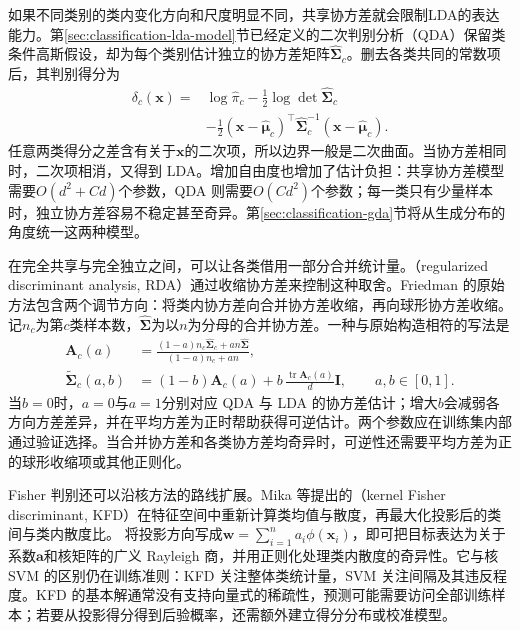如果不同类别的类内变化方向和尺度明显不同，共享协方差就会限制LDA的表达能力。第\ref{sec:classification-lda-model}节已经定义的二次判别分析（QDA）保留类条件高斯假设，却为每个类别估计独立的协方差矩阵$\hat{\bm{\Sigma}}_c$。删去各类共同的常数项后，其判别得分为
\begin{equation}
  \begin{aligned}
    \delta_c(\bm{x})
      ={}&\log\hat{\pi}_c-\frac12\log\det\hat{\bm{\Sigma}}_c\\
        &-\frac12(\bm{x}-\hat{\bm{\mu}}_c)^\top
          \hat{\bm{\Sigma}}_c^{-1}(\bm{x}-\hat{\bm{\mu}}_c).
  \end{aligned}
  \label{eq:classification-qda-score}
\end{equation}
任意两类得分之差含有关于$\bm{x}$的二次项，所以边界一般是二次曲面。当协方差相同时，二次项相消，又得到 LDA。增加自由度也增加了估计负担：共享协方差模型需要$O(d^2+Cd)$个参数，QDA 则需要$O(Cd^2)$个参数；每一类只有少量样本时，独立协方差容易不稳定甚至奇异。第\ref{sec:classification-gda}节将从生成分布的角度统一这两种模型。

在完全共享与完全独立之间，可以让各类借用一部分合并统计量。（regularized discriminant analysis, RDA）通过收缩协方差来控制这种取舍。Friedman 的原始方法包含两个调节方向：将类内协方差向合并协方差收缩，再向球形协方差收缩。
记$n_c$为第$c$类样本数，$\hat{\bm{\Sigma}}$为以$n$为分母的合并协方差。一种与原始构造相符的写法是
\begin{equation}
  \begin{aligned}
    \bm{A}_c(a)
      &=\frac{(1-a)n_c\hat{\bm{\Sigma}}_c+an\hat{\bm{\Sigma}}}
              {(1-a)n_c+an},\\
    \tilde{\bm{\Sigma}}_c(a,b)
      &=(1-b)\bm{A}_c(a)
        +b\,\frac{\operatorname{tr}\bm{A}_c(a)}{d}\bm{I},
        \qquad a,b\in[0,1].
  \end{aligned}
  \label{eq:classification-rda}
\end{equation}
当$b=0$时，$a=0$与$a=1$分别对应 QDA 与 LDA 的协方差估计；增大$b$会减弱各方向方差差异，并在平均方差为正时帮助获得可逆估计。两个参数应在训练集内部通过验证选择。当合并协方差和各类协方差均奇异时，可逆性还需要平均方差为正的球形收缩项或其他正则化。

Fisher 判别还可以沿核方法的路线扩展。Mika 等提出的（kernel Fisher discriminant, KFD）在特征空间中重新计算类均值与散度，再最大化投影后的类间与类内散度比。
将投影方向写成$\bm{w}=\sum_{i=1}^n a_i\phi(\bm{x}_i)$，即可把目标表达为关于系数$\bm{a}$和核矩阵的广义 Rayleigh 商，并用正则化处理类内散度的奇异性。它与核 SVM 的区别仍在训练准则：KFD 关注整体类统计量，SVM 关注间隔及其违反程度。KFD 的基本解通常没有支持向量式的稀疏性，预测可能需要访问全部训练样本；若要从投影得分得到后验概率，还需额外建立得分分布或校准模型。

